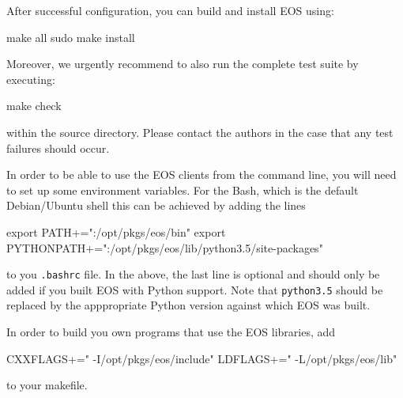 After successful configuration, you can build and install EOS using:
%
\begin{commandline}
make all
sudo make install
\end{commandline}
%
Moreover, we urgently recommend to also run the complete test suite by executing:
%
\begin{commandline}
make check
\end{commandline}
%
within the source directory. Please contact the authors in the case that any
test failures should occur.


In order to be able to use the EOS clients from the command line, you will need to
set up some environment variables. For the Bash, which is the default Debian/Ubuntu
shell this can be achieved by adding the lines
\begin{commandline}
export PATH+=":/opt/pkgs/eos/bin"
export PYTHONPATH+=":/opt/pkgs/eos/lib/python3.5/site-packages"
\end{commandline}
to you \texttt{.bashrc} file. In the above, the last line is optional and should only be
added if you built EOS with Python support. Note that \texttt{python3.5} should be
replaced by the apppropriate Python version against which EOS was built.


In order to build you own programs that use the EOS libraries,
add
\begin{commandline}
CXXFLAGS+=" -I/opt/pkgs/eos/include"
LDFLAGS+=" -L/opt/pkgs/eos/lib"
\end{commandline}
to your makefile.
